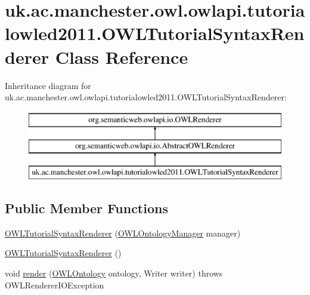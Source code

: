 \hypertarget{classuk_1_1ac_1_1manchester_1_1owl_1_1owlapi_1_1tutorialowled2011_1_1_o_w_l_tutorial_syntax_renderer}{\section{uk.\-ac.\-manchester.\-owl.\-owlapi.\-tutorialowled2011.\-O\-W\-L\-Tutorial\-Syntax\-Renderer Class Reference}
\label{classuk_1_1ac_1_1manchester_1_1owl_1_1owlapi_1_1tutorialowled2011_1_1_o_w_l_tutorial_syntax_renderer}
}
Inheritance diagram for uk.\-ac.\-manchester.\-owl.\-owlapi.\-tutorialowled2011.\-O\-W\-L\-Tutorial\-Syntax\-Renderer\-:\begin{figure}[H]
\begin{center}
\leavevmode
\includegraphics[height=3.000000cm]{classuk_1_1ac_1_1manchester_1_1owl_1_1owlapi_1_1tutorialowled2011_1_1_o_w_l_tutorial_syntax_renderer}
\end{center}
\end{figure}
\subsection*{Public Member Functions}
\begin{DoxyCompactItemize}
\item 
\hyperlink{classuk_1_1ac_1_1manchester_1_1owl_1_1owlapi_1_1tutorialowled2011_1_1_o_w_l_tutorial_syntax_renderer_a77c421efef16e90df54e8664424449a7}{O\-W\-L\-Tutorial\-Syntax\-Renderer} (\hyperlink{interfaceorg_1_1semanticweb_1_1owlapi_1_1model_1_1_o_w_l_ontology_manager}{O\-W\-L\-Ontology\-Manager} manager)
\item 
\hyperlink{classuk_1_1ac_1_1manchester_1_1owl_1_1owlapi_1_1tutorialowled2011_1_1_o_w_l_tutorial_syntax_renderer_aae1c91c98a3d9ccdf28aff747c407882}{O\-W\-L\-Tutorial\-Syntax\-Renderer} ()
\item 
void \hyperlink{classuk_1_1ac_1_1manchester_1_1owl_1_1owlapi_1_1tutorialowled2011_1_1_o_w_l_tutorial_syntax_renderer_a24e77cecf66a61e128d2f97a820ba6ec}{render} (\hyperlink{interfaceorg_1_1semanticweb_1_1owlapi_1_1model_1_1_o_w_l_ontology}{O\-W\-L\-Ontology} ontology, Writer writer)  throws O\-W\-L\-Renderer\-I\-O\-Exception 
\end{DoxyCompactItemize}
